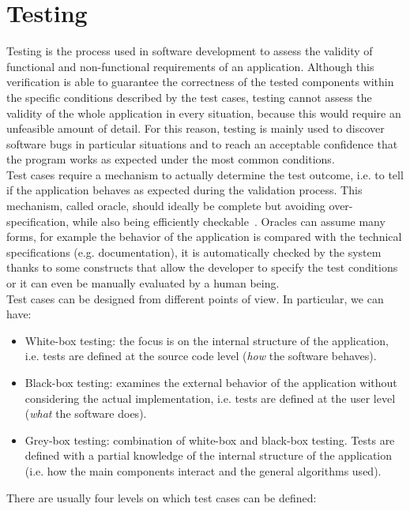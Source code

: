 \documentclass[11pt,a4paper,notitlepage]{article}
\begin{document}
\section{Testing}
Testing is the process used in software development to assess the validity of functional and non-functional requirements of an application. Although this verification is able to guarantee the correctness of the tested components within the specific conditions described by the test cases, testing cannot assess the validity of the whole application in every situation, because this would require an unfeasible amount of detail. For this reason, testing is mainly used to discover software bugs in particular situations and to reach an acceptable confidence that the program works as expected under the most common conditions.\bigskip \\
Test cases require a mechanism to actually determine the test outcome, i.e. to tell if the application behaves as expected during the validation process. This mechanism, called oracle, should ideally be complete but avoiding over-specification, while also being efficiently checkable~\cite{Baresi:Oracles}. Oracles can assume many forms, for example the behavior of the application is compared with the technical specifications (e.g. documentation), it is automatically checked by the system thanks to some constructs that allow the developer to specify the test conditions or it can even be manually evaluated by a human being.\bigskip \\
Test cases can be designed from different points of view. In particular, we can have:
\begin{itemize}
	\item White-box testing: the focus is on the internal structure of the application, i.e. tests are defined at the source code level (\textit{how} the software behaves).
	\item Black-box testing: examines the external behavior of the application without considering the actual implementation, i.e. tests are defined at the user level (\textit{what} the software does).
	\item Grey-box testing: combination of white-box and black-box testing. Tests are defined with a partial knowledge of the internal structure of the application (i.e. how the main components interact and the general algorithms used).
\end{itemize}\bigskip
There are usually four levels on which test cases can be defined:
\end{document}
